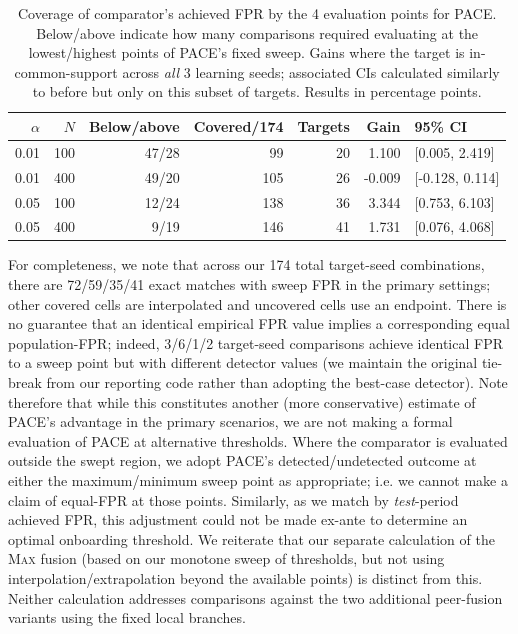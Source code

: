 \begin{table}[!htbp] 
\centering\small 
\caption{Coverage of comparator's achieved FPR by the 4 evaluation points for PACE. Below/above indicate how many comparisons required evaluating at the lowest/highest points of PACE's fixed sweep. Gains where the target is in-common-support across \emph{all} 3 learning seeds; associated CIs calculated similarly to before but only on this subset of targets. Results in percentage points.} 
\label{tab:support} 
\begin{tabular}{rrrrrrl} 
\toprule 
$\alpha$ & $N$ & Below/above & Covered/174 & Targets & Gain & 95\% CI\\
\midrule 
0.01 & 100 & 47/28 & 99 & 20 & 1.100 & [0.005, 2.419]\\
0.01 & 400 & 49/20 & 105 & 26 & -0.009 & [-0.128, 0.114]\\
0.05 & 100 & 12/24 & 138 & 36 & 3.344 & [0.753, 6.103]\\
0.05 & 400 & 9/19 & 146 & 41 & 1.731 & [0.076, 4.068]\\
\bottomrule 
\end{tabular} 
\end{table} 

For completeness, we note that across our 174 total target-seed combinations, there are 72/59/35/41 exact matches with sweep FPR in the primary settings; other covered cells are interpolated and uncovered cells use an endpoint. There is no guarantee that an identical empirical FPR value implies a corresponding equal population-FPR; indeed, 3/6/1/2 target-seed comparisons achieve identical FPR to a sweep point but with different detector values (we maintain the original tie-break from our reporting code rather than adopting the best-case detector). Note therefore that while this constitutes another (more conservative) estimate of PACE's advantage in the primary scenarios, we are not making a formal evaluation of PACE at alternative thresholds. Where the comparator is evaluated outside the swept region, we adopt PACE's detected/undetected outcome at either the maximum/minimum sweep point as appropriate; i.e.  we cannot make a claim of equal-FPR at those points. Similarly, as we match by \emph{test}-period achieved FPR, this adjustment could not be made ex-ante to determine an optimal onboarding threshold. We reiterate that our separate calculation of the \textsc{Max} fusion (based on our monotone sweep of thresholds, but not using interpolation/extrapolation beyond the available points) is distinct from this. Neither calculation addresses comparisons against the two additional peer-fusion variants using the fixed local branches.

